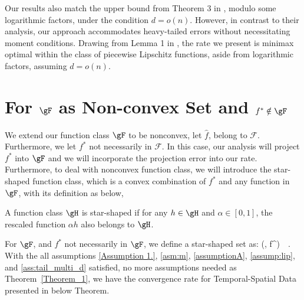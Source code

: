 \documentclass[twoside,11pt]{article}
\begin{document}
Our results also match the upper bound from Theorem 3 in \cite{padilla2023temporal}, modulo some logarithmic factors, under the condition \(d = o(n)\). However, in contrast to their analysis, our approach accommodates heavy-tailed errors without necessitating moment conditions. Drawing from Lemma 1 in \cite{padilla2023temporal}, the rate we present is minimax optimal within the class of piecewise Lipschitz functions, aside from logarithmic factors, assuming \(d = o(n)\).


\section{For $\gF$ as Non-convex Set and $f^* \notin \gF$}

We extend our function class $\gF$ to be nonconvex, let $\hat f$, belong to $\mathcal{F}$. Furthermore, we let $f^*$  not necessarily in $\mathcal{F}$. 
In this case, our analysis will project $f^\ast$ into $\gF$ and we will incorporate the projection error into our rate. 
Furthermore, to deal with nonconvex function class, we will introduce the star-shaped function class, which is a convex combination of $f^\ast$ and any function in $\gF$, with its definition as below, 

\begin{definition}
    A function class $\gH$ is star-shaped if for any $h \in \gH$ and $\alpha \in [0, 1]$, the rescaled function $\alpha h$ also belongs to $\gH$.
\end{definition}

For $\gF$, and $f^\ast$ not necessarily in $\gF$, we define a star-shaped set as:
\beq 
\label{star_shaped}
(\gF, f^\ast) \,\coloneqq\,  \quad {} \mu \in [0,1].
\beq 
With the all assumptions \ref{Assumption 1.}, \ref{asm:m}, \ref{assumptionA}, \ref{assump:lip}, and \ref{ass:tail_multi_d} satisfied, no more assumptions needed as Theorem~\ref{Theorem_1}, we have the convergence rate for Temporal-Spatial Data presented in below Theorem. 
\end{document}
